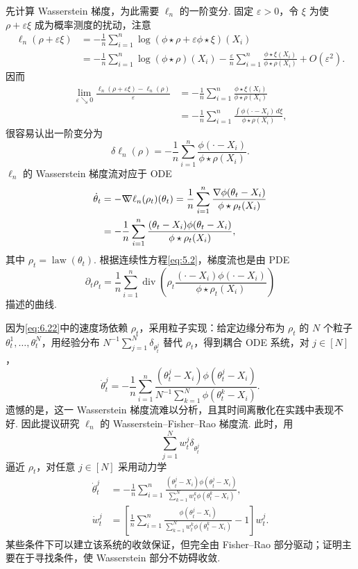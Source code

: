 先计算 Wasserstein 梯度，为此需要 $\ell_n$ 的一阶变分. 固定 $\varepsilon>0$，令 $\xi$ 为使 $\rho+\varepsilon\xi$ 成为概率测度的扰动，注意
$$
\begin{aligned}
\ell_n(\rho+\varepsilon\xi)
&=-\frac1n\sum_{i=1}^n\log(\phi\star\rho+\varepsilon\phi\star\xi)(X_i)\\
&=-\frac1n\sum_{i=1}^n\log(\phi\star\rho)(X_i)
-\frac\varepsilon n\sum_{i=1}^n\frac{\phi\star\xi(X_i)}{\phi\star\rho(X_i)}+O(\varepsilon^2).
\end{aligned}
$$
因而
$$
\begin{aligned}
\lim_{\varepsilon\searrow0}\frac{\ell_n(\rho+\varepsilon\xi)-\ell_n(\rho)}\varepsilon
&=-\frac1n\sum_{i=1}^n\frac{\phi\star\xi(X_i)}{\phi\star\rho(X_i)}\\
&=-\frac1n\sum_{i=1}^n\frac{\int\phi(\cdot-X_i)\,d\xi}{\phi\star\rho(X_i)},
\end{aligned}
$$
很容易认出一阶变分为
$$
\delta\ell_n(\rho)=-\frac1n\sum_{i=1}^n\frac{\phi(\cdot-X_i)}{\phi\star\rho(X_i)}.
$$
$\ell_n$ 的 Wasserstein 梯度流对应于 ODE
\begin{equation}\label{eq:6.22}
\begin{aligned}
\dot\theta_t
&=-\nabla\mkern-10mu\nabla\ell_n(\rho_t)(\theta_t)
=\frac1n\sum_{i=1}^n\frac{\nabla\phi(\theta_t-X_i)}{\phi\star\rho_t(X_i)}\\
&=-\frac1n\sum_{i=1}^n\frac{(\theta_t-X_i)\phi(\theta_t-X_i)}{\phi\star\rho_t(X_i)},
\end{aligned}
\end{equation}
其中 $\rho_t=\operatorname{law}(\theta_t)$. 根据连续性方程\eqref{eq:5.2}，梯度流也是由 PDE
$$
\partial_t\rho_t=\frac1n\sum_{i=1}^n\operatorname{div}
\left(\rho_t\frac{(\cdot-X_i)\phi(\cdot-X_i)}{\phi\star\rho_t(X_i)}\right)
$$
描述的曲线.

因为\eqref{eq:6.22}中的速度场依赖 $\rho_t$，采用粒子实现：给定边缘分布为 $\rho_t$ 的 $N$ 个粒子 $\theta_t^1,\ldots,\theta_t^N$，用经验分布 $N^{-1}\sum_{j=1}^N\delta_{\theta_t^j}$ 替代 $\rho_t$，得到耦合 ODE 系统，对 $j\in[N]$，
$$
\dot\theta_t^j=-\frac1n\sum_{i=1}^n
\frac{(\theta_t^j-X_i)\phi(\theta_t^j-X_i)}{N^{-1}\sum_{k=1}^N\phi(\theta_t^k-X_i)}.
$$
遗憾的是，这一 Wasserstein 梯度流难以分析，且其时间离散化在实践中表现不好. 因此\cite{ref327}提议研究 $\ell_n$ 的 Wasserstein--Fisher--Rao 梯度流. 此时，用
$$
\sum_{j=1}^Nw_t^j\delta_{\theta_t^j}
$$
逼近 $\rho_t$，对任意 $j\in[N]$ 采用动力学
$$
\begin{aligned}
\dot\theta_t^j&=-\frac1n\sum_{i=1}^n
\frac{(\theta_t^j-X_i)\phi(\theta_t^j-X_i)}{\sum_{k=1}^Nw_t^k\phi(\theta_t^k-X_i)},\\
\dot w_t^j&=\left[\frac1n\sum_{i=1}^n
\frac{\phi(\theta_t^j-X_i)}{\sum_{k=1}^Nw_t^k\phi(\theta_t^k-X_i)}-1\right]w_t^j.
\end{aligned}
$$
某些条件下可以建立该系统的收敛保证，但完全由 Fisher--Rao 部分驱动；证明主要在于寻找条件，使 Wasserstein 部分不妨碍收敛.
